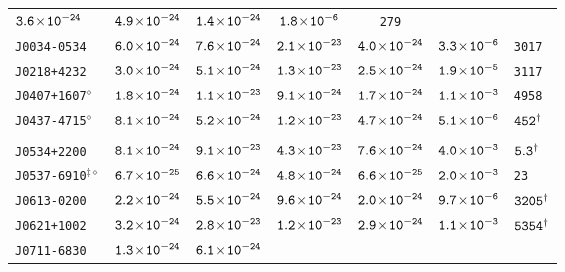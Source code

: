 \begin{longtable}{ l | c | c | c | c | c | l }
\scriptsize{$\tt{3.6\!\times\!10^{-24}}$} & \scriptsize{$\tt{4.9\!\times\!10^{-24}}$} &\scriptsize{$\tt{1.4\!\times\!10^{-24}}$} &
\scriptsize{$\tt{1.8\!\times\!10^{-6}}$} & \scriptsize{\tt{279}} \\[-16pt] 
\scriptsize{\tt{J0034-0534}} & \scriptsize{$\tt{6.0\!\times\!10^{-24}}$} & \scriptsize{$\tt{7.6\!\times\!10^{-24}}$} &
\scriptsize{$\tt{2.1\!\times\!10^{-23}}$} &\scriptsize{$\tt{4.0\!\times\!10^{-24}}$} & \scriptsize{$\tt{3.3\!\times\!10^{-6}}$} &
\scriptsize{\tt{3017}} \\[-16pt] 
\scriptsize{\tt{J0218+4232}} & \scriptsize{$\tt{3.0\!\times\!10^{-24}}$} & \scriptsize{$\tt{5.1\!\times\!10^{-24}}$} &
\scriptsize{$\tt{1.3\!\times\!10^{-23}}$} &\scriptsize{$\tt{2.5\!\times\!10^{-24}}$} & \scriptsize{$\tt{1.9\!\times\!10^{-5}}$} &
\scriptsize{\tt{3117}} \\[-16pt] 
\scriptsize{\tt{J0407+1607}$^{\diamond}$} & \scriptsize{$\tt{1.8\!\times\!10^{-24}}$} &
\scriptsize{$\tt{1.1\!\times\!10^{-23}}$} & \scriptsize{$\tt{9.1\!\times\!10^{-24}}$} &\scriptsize{$\tt{1.7\!\times\!10^{-24}}$} &
\scriptsize{$\tt{1.1\!\times\!10^{-3}}$} & \scriptsize{\tt{4958}} \\[-16pt] 
\scriptsize{\tt{J0437-4715}$^{\diamond}$} & \scriptsize{$\tt{8.1\!\times\!10^{-24}}$} &
\scriptsize{$\tt{5.2\!\times\!10^{-24}}$} & \scriptsize{$\tt{1.2\!\times\!10^{-23}}$} & \scriptsize{$\tt{4.7\!\times\!10^{-24}}$}
& \scriptsize{$\tt{5.1\!\times\!10^{-6}}$} & \scriptsize{$\tt{452^{\dagger}}$} \\[-16pt] 
\\[-20pt] 
\scriptsize{\tt{J0534+2200}} & \scriptsize{$\tt{8.1\!\times\!10^{-24}}$} &
\scriptsize{$\tt{9.1\!\times\!10^{-23}}$} & \scriptsize{$\tt{4.3\!\times\!10^{-23}}$} & \scriptsize{$\tt{7.6\!\times\!10^{-24}}$}
& \scriptsize{$\tt{4.0\!\times\!10^{-3}}$} & \scriptsize{$\tt{5.3^{\dagger}}$} \\[-16pt] 
\scriptsize{\tt{J0537-6910}$^{\ddagger\diamond}$} & \scriptsize{$\tt{6.7\!\times\!10^{-25}}$} &
\scriptsize{$\tt{6.6\!\times\!10^{-24}}$} & \scriptsize{$\tt{4.8\!\times\!10^{-24}}$} &\scriptsize{$\tt{6.6\!\times\!10^{-25}}$} &
\scriptsize{$\tt{2.0\!\times\!10^{-3}}$} & \scriptsize{\tt{23}} \\[-16pt] 
\scriptsize{\tt{J0613-0200}} & \scriptsize{$\tt{2.2\!\times\!10^{-24}}$} & \scriptsize{$\tt{5.5\!\times\!10^{-24}}$} &
\scriptsize{$\tt{9.6\!\times\!10^{-24}}$} & \scriptsize{$\tt{2.0\!\times\!10^{-24}}$} & \scriptsize{$\tt{9.7\!\times\!10^{-6}}$} &
\scriptsize{$\tt{3205^{\dagger}}$} \\[-16pt] 
\scriptsize{\tt{J0621+1002}} & \scriptsize{$\tt{3.2\!\times\!10^{-24}}$} & \scriptsize{$\tt{2.8\!\times\!10^{-23}}$} &
\scriptsize{$\tt{1.2\!\times\!10^{-23}}$} & \scriptsize{$\tt{2.9\!\times\!10^{-24}}$} & \scriptsize{$\tt{1.1\!\times\!10^{-3}}$} &
\scriptsize{$\tt{5354^{\dagger}}$} \\[-16pt] 
\scriptsize{\tt{J0711-6830}} & \scriptsize{$\tt{1.3\!\times\!10^{-24}}$} & \scriptsize{$\tt{6.1\!\times\!10^{-24}}$} &

\end{longtable}
